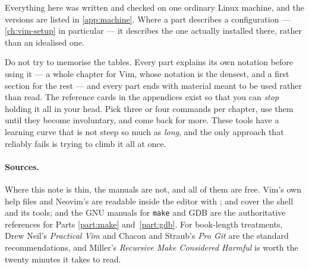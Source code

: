 \documentclass[a4paper,oneside]{scrbook}
\begin{document}
Everything here was written and checked on one ordinary Linux machine, and the
versions are listed in \autoref{app:machine}. Where a part describes a
configuration --- \autoref{ch:vim-setup} in particular --- it describes the one
actually installed there, rather than an idealised one.

Do not try to memorise the tables. Every part explains its own notation before
using it --- a whole chapter for Vim, whose notation is the densest, and a first
section for the rest --- and every part ends with material meant to be used
rather than read. The reference cards in the appendices exist so that you can
\emph{stop} holding it all in your head. Pick three or four commands per chapter,
use them until they become involuntary, and come back for more. These tools have
a learning curve that is not steep so much as \emph{long}, and the only approach
that reliably fails is trying to climb it all at once.

\paragraph{Sources.}
Where this note is thin, the manuals are not, and all of them are free. Vim's
own help files \cite{vimdoc} and Neovim's \cite{nvimdoc} are readable inside the
editor with ;  and  cover the shell and its tools;
and the GNU manuals for \texttt{make} \cite{gnumake} and GDB \cite{gdbmanual}
are the authoritative references for Parts \ref{part:make} and~\ref{part:gdb}.
For book-length treatments, Drew Neil's \emph{Practical Vim}
\cite{neil2015practicalvim} and Chacon and Straub's \emph{Pro Git}
\cite{chacon2014progit} are the standard recommendations, and Miller's
\emph{Recursive Make Considered Harmful} \cite{miller1998recursive} is worth the
twenty minutes it takes to read.

\newpage

\tableofcontents

\end{document}
